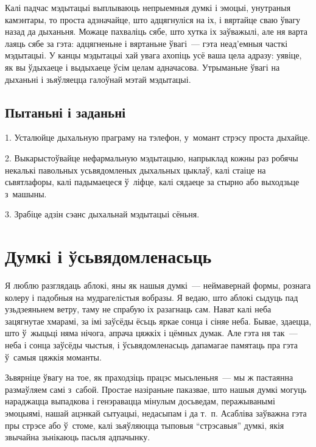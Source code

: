 Калі падчас мэдытацыі выплываюць непрыемныя думкі і эмоцыі, унутраныя камэнтары, то проста адзначайце, што адцягнуліся на іх, і вяртайце сваю ўвагу назад да дыханьня. Можаце пахваліць сябе, што хутка іх заўважылі, але ня варта лаяць сябе за гэта: адцягненьне і вяртаньне ўвагі~--- гэта неад'емныя часткі мэдытацыі. У канцы мэдытацыі хай увага ахопіць усё ваша цела адразу: уявіце, як вы ўдыхаеце і выдыхаеце ўсім целам адначасова. Утрыманьне ўвагі на дыханьні і зьяўляецца галоўнай мэтай мэдытацыі.

\subsection*{Пытаньні і заданьні}

1. Усталюйце дыхальную праграму на тэлефон, у~момант стрэсу проста дыхайце.

2. Выкарыстоўвайце нефармальную мэдытацыю, напрыклад кожны раз робячы некалькі павольных усьвядомленых дыхальных цыклаў, калі стаіце на сьвятлафоры, калі падымаецеся ў~ліфце, калі сядаеце за стырно або выходзьце з~машыны.

3. Зрабіце адзін сэанс дыхальнай мэдытацыі сёньня.


\section{Думкі і ўсьвядомленасьць}

Я люблю разглядаць аблокі, яны як нашыя думкі~--- неймавернай формы, рознага колеру і падобныя на мудрагелістыя вобразы. Я ведаю, што аблокі сыдуць пад узьдзеяньнем ветру, таму не спрабую іх разагнаць сам. Нават калі неба зацягнутае хмарамі, за імі заўсёды ёсьць яркае сонца і сіняе неба. Бывае, здаецца, што ў~жыцьці няма нічога, апрача цяжкіх і цёмных думак. Але гэта ня так~--- неба і сонца заўсёды чыстыя, і ўсьвядомленасьць дапамагае памятаць пра гэта ў~самыя цяжкія моманты.


Зьвярніце ўвагу на тое, як праходзіць працэс мысьленьня~--- мы ж пастаянна размаўляем самі з~сабой. Простае назіраньне паказвае, што нашыя думкі могуць нараджацца выпадкова і генэравацца мінулым досьведам, перажыванымі эмоцыямі, нашай ацэнкай сытуацыі, недасыпам і да т.~п. Асабліва заўважна гэта пры стрэсе або ў~стоме, калі зьяўляюцца тыповыя ``стрэсавыя'' думкі, якія звычайна зьнікаюць пасьля адпачынку.

